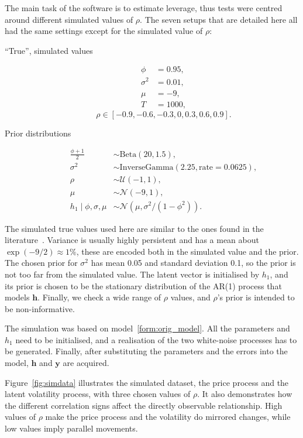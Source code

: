 The main task of the software is to estimate leverage, thus tests were centred around different simulated values of $\rho$.
The seven setups that are detailed here all had the same settings except for the simulated value of $\rho$:
\begin{description}
	\item[``True'', simulated values]
	\begin{align*}
	\phi &= 0.95, \\
	\sigma^2 &= 0.01, \\
	\mu &= -9, \\
	T &= 1000,
	\end{align*}
	\begin{equation*}
	\rho\in[-0.9,-0.6,-0.3,0,0.3,0.6,0.9].
	\end{equation*}
	\item[Prior distributions]
	\begin{align*}
	\frac{\phi+1}2 &\sim\text{Beta}(20,1.5), \\
	\sigma^2 &\sim\text{InverseGamma}(2.25,\text{rate}=0.0625), \\
	\rho &\sim\mathcal{U}(-1,1), \\
	\mu &\sim\mathcal{N}(-9,1), \\
	h_1\mid\phi,\sigma,\mu &\sim\mathcal{N}(\mu,\sigma^2/(1-\phi^2)).
	\end{align*}
\end{description}
The simulated true values used here are similar to the ones found in the literature~\citep{Omori2007,Kastner2014}.
Variance is usually highly persistent and has a mean about $\exp(-9/2)\approx 1\%$, these are encoded both in the simulated value and the prior.
The chosen prior for $\sigma^2$ has mean 0.05 and standard deviation 0.1, so the prior is not too far from the simulated value.
The latent vector is initialised by $h_1$, and its prior is chosen to be the stationary distribution of the AR(1) process that models $\bm h$.
Finally, we check a wide range of $\rho$ values, and $\rho$'s prior is intended to be non-informative.

The simulation was based on model~\eqref{form:orig_model}.
All the parameters and $h_1$ need to be initialised, and a realisation of the two white-noise processes has to be generated.
Finally, after substituting the parameters and the errors into the model, $\bm h$ and $\bm y$ are acquired.

Figure~\ref{fig:simdata} illustrates the simulated dataset, the price process and the latent volatility process, with three chosen values of $\rho$.
It also demonstrates how the different correlation signs affect the directly observable relationship.
High values of $\rho$ make the price process and the volatility do mirrored changes, while low values imply parallel movements.

